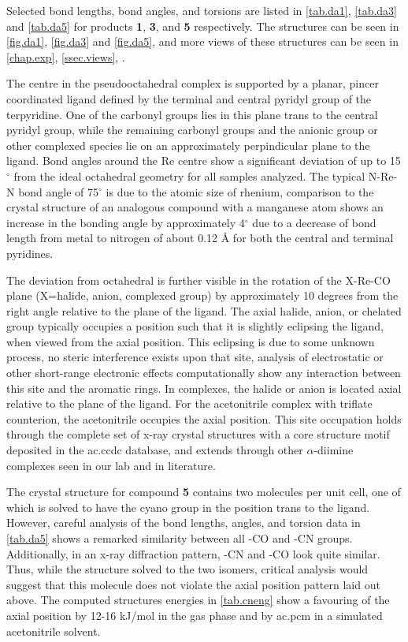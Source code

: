Selected bond lengths, bond angles, and torsions are listed in \autoref{tab.da1}, \autoref{tab.da3} and \autoref{tab.da5} for products \textbf{1}, \textbf{3}, and \textbf{5} respectively. The structures can be seen in \autoref{fig.da1}, \autoref{fig.da3} and \autoref{fig.da5}, and more views of these structures can be seen in \autoref{chap.exp}, \autoref{ssec.views}, . 

The  centre in the pseudooctahedral complex is supported by a planar, pincer coordinated ligand defined by the terminal and central pyridyl group of the terpyridine. One of the carbonyl groups lies in this plane trans to the central pyridyl group, while the remaining carbonyl groups and the anionic group or other complexed species lie on an approximately perpindicular plane to the ligand. Bond angles around the Re centre show a significant deviation of up to 15$^\circ$ from the ideal octahedral geometry for all samples analyzed. The typical N-Re-N bond angle of 75$^\circ$ is due to the atomic size of rhenium, comparison to the crystal structure of an analogous compound with a manganese atom\autocite{compain2014} shows an increase in the bonding angle by approximately 4$^\circ$ due to a decrease of bond length from metal to nitrogen of about 0.12 \r{A} for both the central and terminal pyridines. 

The deviation from octahedral is further visible in the rotation of the X-Re-CO plane (X=halide, anion, complexed group) by approximately 10 degrees from the right angle relative to the plane of the ligand. The axial halide, anion, or chelated group typically occupies a position such that it is slightly eclipsing the ligand, when viewed from the axial position. This eclipsing is due to some unknown process, no steric interference exists upon that site, analysis of electrostatic or other short-range electronic effects computationally show any interaction between this site and the aromatic rings. In  complexes, the halide or anion is located axial relative to the plane of the ligand. For the acetonitrile complex with triflate counterion, the acetonitrile occupies the axial position. This site occupation holds through the complete set of x-ray crystal structures with a  core structure motif deposited in the \gls{ac.ccdc} database\autocite{allen2002}, and extends through other $\alpha$-diimine complexes seen in our lab and in literature\autocite{jurca2013}. 

The crystal structure for compound \textbf{5} contains two molecules per unit cell, one of which is solved to have the cyano group in the position trans to the ligand. However, careful analysis of the bond lengths, angles, and torsion data in \autoref{tab.da5} shows a remarked similarity between all -CO and -CN groups. Additionally, in an x-ray diffraction pattern, -CN and -CO look quite similar. Thus, while the structure solved to the two isomers, critical analysis would suggest that this molecule does not violate the axial position pattern laid out above. The computed structures energies in \autoref{tab.cneng} show a favouring of the axial position by 12-16 kJ/mol in the gas phase and by \gls{ac.pcm} in a simulated acetonitrile solvent. 

